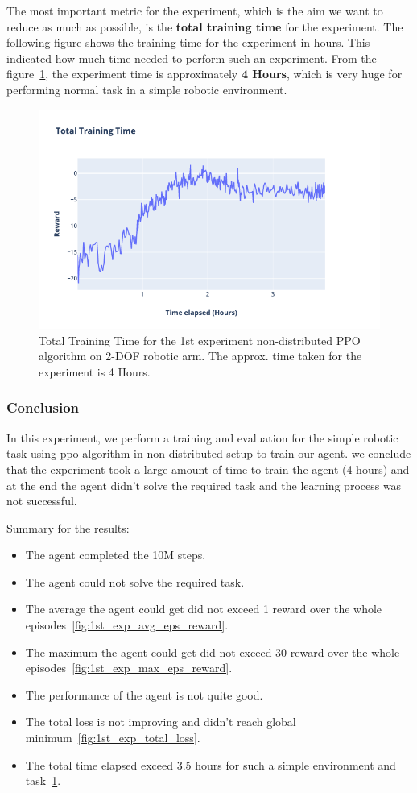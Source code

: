 The most important metric for the experiment, which is the aim we want to reduce as much as possible, is the \textbf{total training time} for the experiment. The following figure shows the training time for the experiment in hours. This indicated how much time needed to perform such an experiment. From the figure~\ref{fig:1st_exp_total_training_time}, the experiment time is approximately \textbf{4 Hours}, which is very huge for performing normal task in a simple robotic environment.
\begin{figure}[H] %
	\centering
	\includegraphics[width=1.2\linewidth]{figures/exps/1st_exp/total_time}
	\caption{Total Training Time for the 1st experiment non-distributed PPO algorithm on 2-DOF robotic arm. The approx. time taken for the experiment is 4 Hours.}
	\label{fig:1st_exp_total_training_time}
\end{figure}

\subsubsection{Conclusion}

In this experiment, we perform a training and evaluation for the simple robotic task using ppo algorithm in non-distributed setup to train our agent. we conclude that the experiment took a large amount of time to train the agent (4 hours) and at the end the agent didn't solve the required task and the learning process was not successful. 

Summary for the results:
\begin{itemize}
	\item The agent completed the 10M steps.
	\item The agent could not solve the required task.
	\item The average the agent could get did not exceed 1 reward over the whole episodes~\ref{fig:1st_exp_avg_eps_reward}.
	\item The maximum the agent could get did not exceed 30 reward over the whole episodes~\ref{fig:1st_exp_max_eps_reward}.
	\item The performance of the agent is not quite good.
	\item The total loss is not improving and didn't reach global minimum~\ref{fig:1st_exp_total_loss}.
	\item The total time elapsed exceed 3.5 hours for such a simple environment and task~\ref{fig:1st_exp_total_training_time}.
\end{itemize}